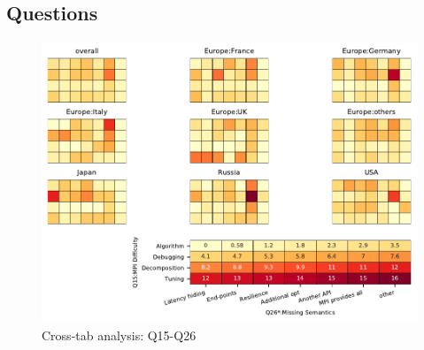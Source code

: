 
\subsection{Questions}


\begin{figure}
\begin{center}
\includegraphics[width=12cm]{../pdfs/Q15-Q26.pdf}
\caption{Cross-tab analysis: Q15-Q26}
\label{fig:Q15-Q26}
\end{center}
\end{figure}
